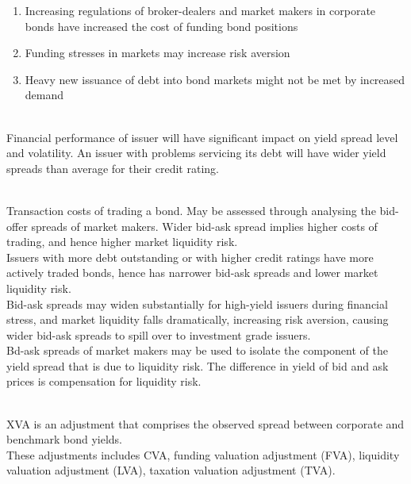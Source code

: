 \begin{remark} 
\begin{enumerate}[label=\roman*.]
\setlength{\itemsep}{0pt}
\item Increasing regulations of broker-dealers and market makers in corporate bonds have increased the cost of funding bond positions
\item Funding stresses in markets may increase risk aversion
\item Heavy new issuance of debt into bond markets might not be met by increased demand
\end{enumerate}
\end{remark}

\begin{remark} \\
Financial performance of issuer will have significant impact on yield spread level and volatility. An issuer with problems servicing its debt will have wider yield spreads than average for their credit rating.
\end{remark}

\begin{remark} \\
Transaction costs of trading a bond. May be assessed through analysing the bid-offer spreads of market makers. Wider bid-ask spread implies higher costs of trading, and hence higher market liquidity risk.\\
Issuers with more debt outstanding or with higher credit ratings have more actively traded bonds, hence has narrower bid-ask spreads and lower market liquidity risk.\\
Bid-ask spreads may widen substantially for high-yield issuers during financial stress, and market liquidity falls dramatically, increasing risk aversion, causing wider bid-ask spreads to spill over to investment grade issuers.\\
Bd-ask spreads of market makers may be used to isolate the component of the yield spread that is due to liquidity risk. The difference in yield of bid and ask prices is compensation for liquidity risk.
\end{remark}

\begin{remark}  \\
XVA is an adjustment that comprises the observed spread between corporate and benchmark bond yields.\\
These adjustments includes CVA, funding valuation adjustment (FVA), liquidity valuation adjustment (LVA), taxation valuation adjustment (TVA).
\end{remark}

